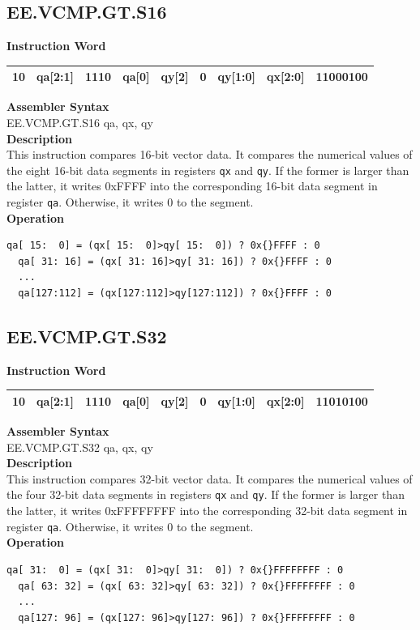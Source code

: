 \clearpage
\subsection{EE.VCMP.GT.S16}\label{instruction:EEVCMPGTS16}
\setlength\tabcolsep{6pt}
\textbf{Instruction Word} \\
\begin{tabular}{|c|c|c|c|c|c|c|c|c|}
	\hline
	10 & qa[2:1] & 1110 & qa[0] & qy[2] & 0 & qy[1:0] & qx[2:0] & 11000100 \\
	\hline
\end{tabular}

\textbf{Assembler Syntax} \\
EE.VCMP.GT.S16 qa, qx, qy \\
\textbf{Description} \\
This instruction compares 16-bit vector data. It compares the numerical values of the eight 16-bit data segments in registers \lstinline{qx} and \lstinline{qy}. If the former is larger than the latter, it writes 0x{}FFFF into the corresponding 16-bit data segment in register \lstinline{qa}. Otherwise, it writes 0 to the segment.\\
\textbf{Operation}
\begin{lstlisting}[escapeinside=`?]
  qa[ 15:  0] = (qx[ 15:  0]>qy[ 15:  0]) ? 0x{}FFFF : 0
  qa[ 31: 16] = (qx[ 31: 16]>qy[ 31: 16]) ? 0x{}FFFF : 0
  ...
  qa[127:112] = (qx[127:112]>qy[127:112]) ? 0x{}FFFF : 0
\end{lstlisting}

\clearpage
\subsection{EE.VCMP.GT.S32}\label{instruction:EEVCMPGTS32}
\setlength\tabcolsep{6pt}
\textbf{Instruction Word} \\
\begin{tabular}{|c|c|c|c|c|c|c|c|c|}
	\hline
	10 & qa[2:1] & 1110 & qa[0] & qy[2] & 0 & qy[1:0] & qx[2:0] & 11010100 \\
	\hline
\end{tabular}

\textbf{Assembler Syntax} \\
EE.VCMP.GT.S32 qa, qx, qy \\
\textbf{Description} \\
This instruction compares 32-bit vector data. It compares the numerical values of the four 32-bit data segments in registers \lstinline{qx} and \lstinline{qy}. If the former is larger than the latter, it writes 0x{}FFFFFFFF into the corresponding 32-bit data segment in register \lstinline{qa}. Otherwise, it writes 0 to the segment.\\
\textbf{Operation}
\begin{lstlisting}[escapeinside=`?]
  qa[ 31:  0] = (qx[ 31:  0]>qy[ 31:  0]) ? 0x{}FFFFFFFF : 0
  qa[ 63: 32] = (qx[ 63: 32]>qy[ 63: 32]) ? 0x{}FFFFFFFF : 0
  ...
  qa[127: 96] = (qx[127: 96]>qy[127: 96]) ? 0x{}FFFFFFFF : 0
\end{lstlisting}

